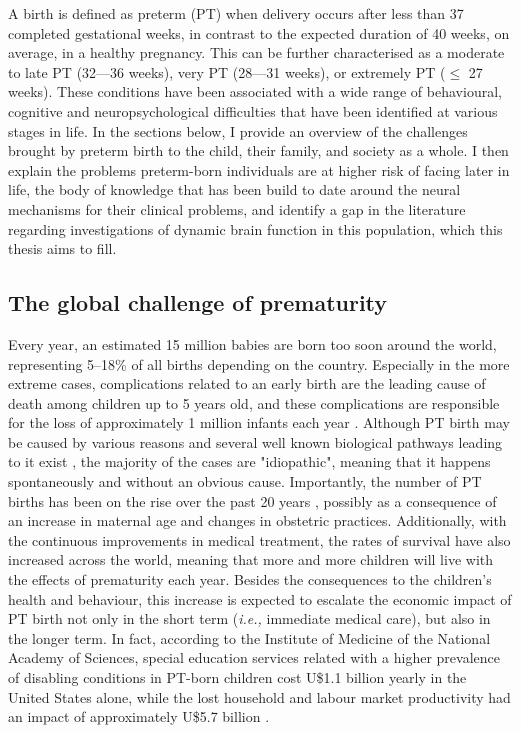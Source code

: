 A birth is defined as preterm (PT) when delivery occurs after less than 37 completed gestational weeks, in contrast to the expected duration of 40 weeks, on average, in a healthy pregnancy. This can be further characterised as a moderate to late PT (32---36 weeks), very PT (28---31 weeks),  or extremely PT ($\leq$ 27 weeks). These conditions have been associated with a wide range of behavioural, cognitive and neuropsychological difficulties that have been identified at various stages in life. In the sections below, I provide an overview of the challenges brought by preterm birth to the child, their family, and society as a whole. I then explain the problems preterm-born individuals are at higher risk of facing later in life, the body of knowledge that has been build to date around the neural mechanisms for their clinical problems, and identify a gap in the literature regarding investigations of dynamic brain function in this population, which this thesis aims to fill. 


\subsection{The global challenge of prematurity}

Every year, an estimated 15 million babies are born too soon around the world, representing 5–18\% of all births depending on the country. 
Especially in the more extreme cases, complications related to an early birth are the leading cause of death among children up to 5 years old, and these complications are responsible for the loss of approximately 1 million infants each year \citep{Liu2016}. 
Although PT birth may be caused by various reasons and several well known biological pathways leading to it exist \citep{Behrman2007}, the majority of the cases are "idiopathic", meaning that it happens spontaneously and without an obvious cause.
Importantly, the number of PT births has been on the rise over the past 20 years \citep{Costeloe2012}, possibly as a consequence of  an increase in maternal age and changes in obstetric practices. 
Additionally, with the continuous improvements in medical treatment, the rates of survival have also increased across the world, meaning that more and more children will live with the effects of prematurity each year. 
Besides the consequences to the children's health and behaviour, this increase is expected to escalate the economic impact of PT birth not only in the short term (\textit{i.e.,} immediate medical care), but also in the longer term. 
In fact, according to the Institute of Medicine of the National Academy of Sciences, special education services related with a higher prevalence of disabling conditions in PT-born children cost U\$1.1 billion yearly in the United States alone, while the lost household and labour market productivity had an impact of approximately U\$5.7 billion \citep{Behrman2007}. %






